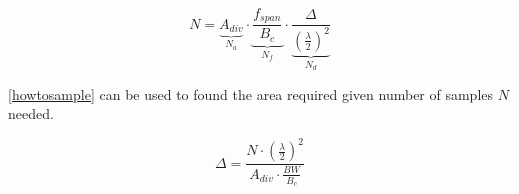 
\begin{equation}
N = \underbrace{A_{div}}_\text{$N_a$} \cdot \underbrace{\frac{f_{span}}{B_c }}_\text{$N_f$} \cdot \underbrace{\frac{\Delta}{(\frac{\lambda}{2})^2}}_\text{$N_d$}
\label{howtosample}
\end{equation} 
 
\begin{where}
\end{where} 
 

\autoref{howtosample} can be used to found the area required given number of samples $N$ needed.

\begin{equation}
\Delta  = \frac{N\cdot (\frac{\lambda}{2})^2}{A_{div}\cdot \frac{BW}{B_c}}
\label{howtosqaure}
\end{equation}


